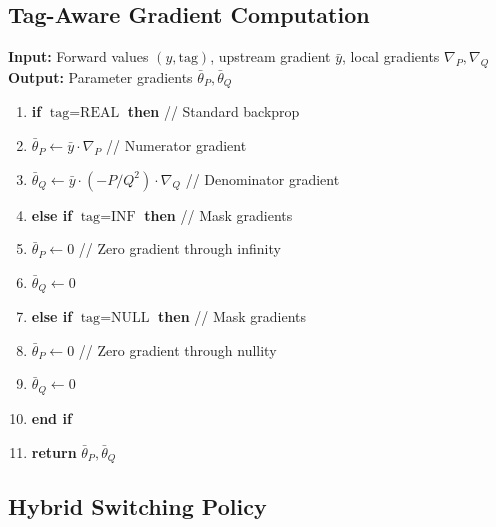 \documentclass[twoside,11pt]{article}
\begin{document}
\subsection{Tag-Aware Gradient Computation}

\begin{tcolorbox}[colback=gray!5!white,colframe=gray!75!black,title=\textbf{Algorithm 2: Mask-REAL Gradient Computation}]
\textbf{Input:} Forward values $(y, \text{tag})$, upstream gradient $\bar{y}$, local gradients $\nabla_P, \nabla_Q$ \\
\textbf{Output:} Parameter gradients $\bar{\theta}_P, \bar{\theta}_Q$

\begin{enumerate}
\item \textbf{if} $\text{tag} = \text{REAL}$ \textbf{then} \hfill // Standard backprop
\item \quad $\bar{\theta}_P \leftarrow \bar{y} \cdot \nabla_P$ \hfill // Numerator gradient
\item \quad $\bar{\theta}_Q \leftarrow \bar{y} \cdot (-P/Q^2) \cdot \nabla_Q$ \hfill // Denominator gradient
\item \textbf{else if} $\text{tag} = \text{INF}$ \textbf{then} \hfill // Mask gradients
\item \quad $\bar{\theta}_P \leftarrow 0$ \hfill // Zero gradient through infinity
\item \quad $\bar{\theta}_Q \leftarrow 0$
\item \textbf{else if} $\text{tag} = \text{NULL}$ \textbf{then} \hfill // Mask gradients  
\item \quad $\bar{\theta}_P \leftarrow 0$ \hfill // Zero gradient through nullity
\item \quad $\bar{\theta}_Q \leftarrow 0$
\item \textbf{end if}
\item \textbf{return} $\bar{\theta}_P, \bar{\theta}_Q$
\end{enumerate}
\end{tcolorbox}

\subsection{Hybrid Switching Policy}
\end{document}
